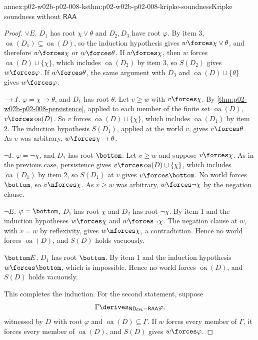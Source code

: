 \begin{annexitem}{annex:p02-w02b-p02-008-ks}{thm:p02-w02b-p02-008-kripke-soundness}{Kripke soundness without \(\mathsf{RAA}\)}
\begin{proof}
\emph{\(\lor E\).}  \(D_1\) has root \(\chi\lor\theta\) and \(D_2,D_3\) have
root \(\varphi\).  By item 3, \(\operatorname{oa}(D_1)\subseteq\operatorname{oa}(D)\),
so the induction hypothesis gives \(w\forces\chi\lor\theta\), and therefore
\(w\forces\chi\) or \(w\forces\theta\).  If \(w\forces\chi\), then \(w\)
forces \(\operatorname{oa}(D)\cup\{\chi\}\), which includes
\(\operatorname{oa}(D_2)\) by item 3, so \(S(D_2)\) gives
\(w\forces\varphi\).  If \(w\forces\theta\), the same argument with \(D_3\)
and \(\operatorname{oa}(D)\cup\{\theta\}\) gives \(w\forces\varphi\).

\emph{\(\to I\).}  \(\varphi=\chi\to\theta\), and \(D_1\) has root \(\theta\).
Let \(v\geq w\) with \(v\forces\chi\).  By
\cref{thm:p02-w02b-p02-008-persistence}, applied to each member of the
finite set \(\operatorname{oa}(D)\), \(v\forces\operatorname{oa}(D)\).  So
\(v\) forces \(\operatorname{oa}(D)\cup\{\chi\}\), which includes
\(\operatorname{oa}(D_1)\) by item 2.  The induction hypothesis \(S(D_1)\),
applied at the world \(v\), gives \(v\forces\theta\).  As \(v\) was
arbitrary, \(w\forces\chi\to\theta\).

\emph{\(\neg I\).}  \(\varphi=\neg\chi\), and \(D_1\) has root \(\bottom\).
Let \(v\geq w\) and suppose \(v\forces\chi\).  As in the previous case,
persistence gives \(v\forces\operatorname{oa}(D)\cup\{\chi\}\), which includes
\(\operatorname{oa}(D_1)\) by item 2, so \(S(D_1)\) at \(v\) gives
\(v\forces\bottom\).  No world forces \(\bottom\), so \(v\nforces\chi\).  As
\(v\geq w\) was arbitrary, \(w\forces\neg\chi\) by the negation clause.

\emph{\(\neg E\).}  \(\varphi=\bottom\), \(D_1\) has root \(\chi\) and \(D_2\)
has root \(\neg\chi\).  By item 1 and the induction hypotheses
\(w\forces\chi\) and \(w\forces\neg\chi\).  The negation clause at \(w\),
with \(v=w\) by reflexivity, gives \(w\nforces\chi\), a contradiction.
Hence no world forces \(\operatorname{oa}(D)\), and \(S(D)\) holds
vacuously.

\emph{\(\bottom E\).}  \(D_1\) has root \(\bottom\).  By item 1 and the
induction hypothesis \(w\forces\bottom\), which is impossible.  Hence no
world forces \(\operatorname{oa}(D)\), and \(S(D)\) holds vacuously.

This completes the induction.  For the second statement, suppose
\[
  \Gamma\derives_{\mathsf{ND}_{\mathsf{CPL}}-\mathsf{RAA}}\varphi,
\]
witnessed by \(D\) with root \(\varphi\) and \(\operatorname{oa}(D)\subseteq\Gamma\).  If
\(w\) forces every member of \(\Gamma\), it forces every member of
\(\operatorname{oa}(D)\), and \(S(D)\) gives \(w\forces\varphi\).
\end{proof}
\end{annexitem}

